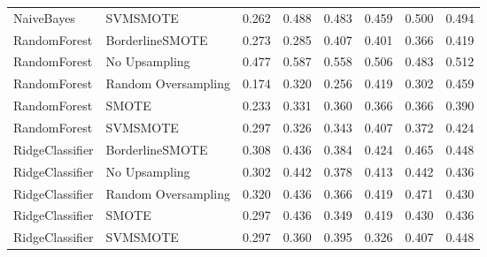 \begin{tabular}{llllllll}
                  NaiveBayes &            SVMSMOTE &     0.262 &                     0.488 &                 0.483 &                  0.459 &                                   0.500 &     0.494 \\
                RandomForest &     BorderlineSMOTE &     0.273 &                     0.285 &                 0.407 &                  0.401 &                                   0.366 &     0.419 \\
                RandomForest &       No Upsampling &     0.477 &                     0.587 &                 0.558 &                  0.506 &                                   0.483 &     0.512 \\
                RandomForest & Random Oversampling &     0.174 &                     0.320 &                 0.256 &                  0.419 &                                   0.302 &     0.459 \\
                RandomForest &               SMOTE &     0.233 &                     0.331 &                 0.360 &                  0.366 &                                   0.366 &     0.390 \\
                RandomForest &            SVMSMOTE &     0.297 &                     0.326 &                 0.343 &                  0.407 &                                   0.372 &     0.424 \\
             RidgeClassifier &     BorderlineSMOTE &     0.308 &                     0.436 &                 0.384 &                  0.424 &                                   0.465 &     0.448 \\
             RidgeClassifier &       No Upsampling &     0.302 &                     0.442 &                 0.378 &                  0.413 &                                   0.442 &     0.436 \\
             RidgeClassifier & Random Oversampling &     0.320 &                     0.436 &                 0.366 &                  0.419 &                                   0.471 &     0.430 \\
             RidgeClassifier &               SMOTE &     0.297 &                     0.436 &                 0.349 &                  0.419 &                                   0.430 &     0.436 \\
             RidgeClassifier &            SVMSMOTE &     0.297 &                     0.360 &                 0.395 &                  0.326 &                                   0.407 &     0.448 \\

\end{tabular}
